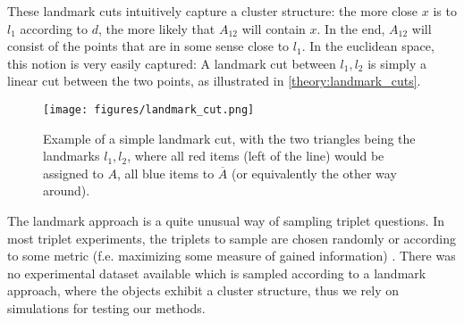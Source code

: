 These landmark cuts intuitively capture a cluster structure: the more close $x$ is to $l_1$ according to $d$, the more likely that $A_{12}$ will contain $x$. In the end, $A_{12}$ will
consist of the points that are in some sense close to $l_1$. In the euclidean space, this notion is very easily captured: A landmark cut between $l_1, l_2$ is
simply a linear cut between the two points, as illustrated in \autoref{theory:landmark_cuts}.

    \begin{figure}[ht]
        \centering
        \texttt{[image: figures/landmark\_cut.png]}
        \caption{Example of a simple landmark cut, with the two triangles being the landmarks $l_1, l_2$, where all red items (left of the line) 
        would be assigned to $A$, all blue items to $\overline{A}$ (or equivalently the other way around).}
        \label{fig:landmark_cut}
    \end{figure}

The landmark approach is a quite unusual way of sampling triplet questions.
In most triplet experiments, the triplets to sample are chosen randomly \cite{kleindessnerLensDepthFunction2017, haghiriEstimationPerceptualScales2020} 
or according to some metric (f.e. maximizing some measure of gained information) \cite{roadsEnrichingImageNetHuman2021}. 
There was no experimental dataset available which is sampled according to a landmark approach, where the objects exhibit a cluster structure, thus we rely on simulations
for testing our methods.

